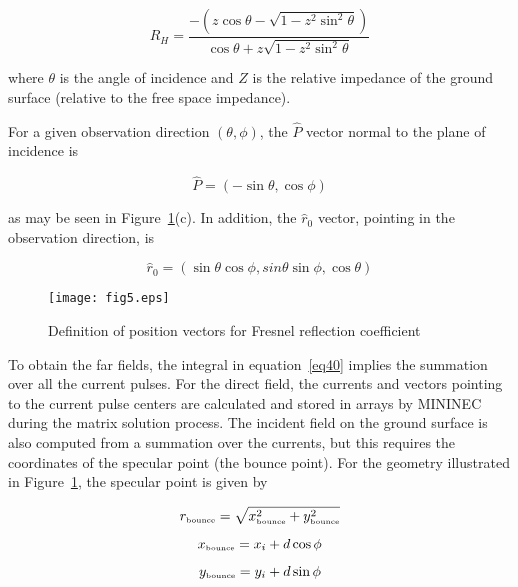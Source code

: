 \documentclass[12pt]{article}
\begin{document}
\begin{equation}
R_H = \frac{-\left(z\cos\theta - \sqrt{1-z^2\sin^2\theta}\right)}
           {\cos\theta + z\sqrt{1-z^2\sin^2\theta}}
\label{eq48}
\end{equation}

\noindent where $\theta$ is the angle of incidence and $Z$ is the relative
impedance of the ground surface (relative to the free space impedance).

For a given observation direction $(\theta, \phi)$, the $\hat{P}$ vector
normal to the plane of incidence is

\begin{equation}
\hat{P} = (-\sin\theta, \cos\phi)
\label{eq49}
\end{equation}

\noindent as may be seen in Figure~\ref{fig5}(c). In addition, the $\hat{r}_0$
vector, pointing in the observation direction, is

\begin{equation}
\hat{r}_0 = (\sin\theta\cos\phi, sin\theta\sin\phi, \cos\theta)
\label{eq50}
\end{equation}

\begin{figure}[htb]
\centerline{\texttt{[image: fig5.eps]}}
\caption{Definition of position vectors for Fresnel reflection coefficient}
\label{fig5}
\end{figure}

To obtain the far fields, the integral in equation~\eqref{eq40} implies
the summation over all the current pulses. For the direct field, the
currents and vectors pointing to the current pulse centers are
calculated and stored in arrays by MININEC during the matrix solution
process. The incident field on the ground surface is also computed from
a summation over the currents, but this requires the coordinates of the
specular point (the bounce point). For the geometry illustrated in
Figure~\ref{fig5}, the specular point is given by

\begin{equation}
r_{\mbox{\tiny bounce}} = \sqrt{x_{\mbox{\tiny bounce}}^2 + y_{\mbox{\tiny bounce}}^2}
\label{eq51}
\end{equation}

\begin{equation}
x_{\mbox{\tiny bounce}} = x_i + d\cos\phi
\label{eq52}
\end{equation}

\begin{equation}
y_{\mbox{\tiny bounce}} = y_i + d\sin\phi
\label{eq53}
\end{equation}
\end{document}
